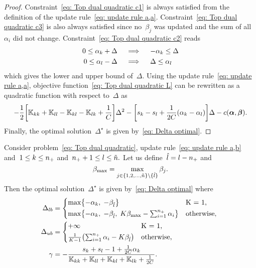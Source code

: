 \begin{proof}
  Constraint~\eqref{eq: Top dual quadratic c1} is always satisfied from the definition of the update rule~\eqref{eq: update rule a,a}. Constraint~\eqref{eq: Top dual quadratic c3} is also always satisfied since no~$\beta_j$ was updated and the sum of all~$\alpha_i$ did not change. Constraint~\eqref{eq: Top dual quadratic c2} reads
  \begin{align*}
    0 \leq \alpha_k + \Delta
    & \quad \implies \quad
    - \alpha_k \leq \Delta \\
    0 \leq \alpha_l - \Delta
    & \quad \implies \quad
    \Delta \leq \alpha_l
  \end{align*}
  which gives the lower and upper bound of~$\Delta.$ Using the update rule~\eqref{eq: update rule a,a}, objective function~\eqref{eq: Top dual quadratic L} can be rewritten as a quadratic function with respect to~$\Delta$ as
  \begin{equation*}
    - \frac{1}{2} \Brac[s]{\K_{kk} + \K_{ll} - \K_{kl} - \K_{lk} + \frac{1}{C}} \Delta^2
    - \Brac[s]{s_k - s_l + \frac{1}{2C}(\alphak - \alphal)} \Delta
    - c(\bm{\alpha}, \bm{\beta}).
  \end{equation*}
  Finally, the optimal solution~$\Delta^{\star}$ is given by~\eqref{eq: Delta optimal}.
\end{proof}

\begin{lemma}
  Consider problem~\eqref{eq: Top dual quadratic}, update rule~\eqref{eq: update rule a,b} and~$1 \leq k \leq n_{+}$ and~$n_{+} + 1 \leq l \leq \tilde{n}.$ Let us define~$\hat{l} = l - n_{+}$ and
  \begin{equation*}
    \beta_{\max} = \max_{j \in \{1, 2, \ldots, \tilde{n} \} \setminus \{\hat{l}\}} \beta_j.
  \end{equation*}
  Then the optimal solution~$\Delta^{\star}$ is given by~\eqref{eq: Delta optimal} where
  \begin{align*}
    \Delta_{lb} & = 
      \begin{cases*}
        \max \Brac[c]{- \alphak,\;  -\betal} & K = 1, \\
        \max \Brac[c]{- \alphak,\;  -\betal, \; K\beta_{\max} - \sum_{i = 1}^{\npos} \alpha_i} & \textrm{otherwise},
      \end{cases*} \\
    \Delta_{ub} & = 
      \begin{cases*}
        + \infty & K = 1, \\
        \frac{1}{K-1}\Brac{\sum_{i = 1}^{\npos} \alpha_i - K \betal} & \textrm{otherwise},
      \end{cases*} \\
    \gamma & = -\frac{s_k + s_l - 1 + \frac{1}{2C} \alphak}{\K_{kk} + \K_{ll} + \K_{kl} + \K_{lk} + \frac{1}{2C}}.
  \end{align*}
\end{lemma}

